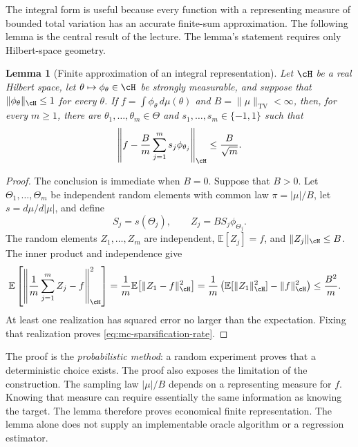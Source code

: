 \documentclass[11pt,twoside]{article}
\newcommand{\E}{\mathbb E}
\newcommand{\TV}{\operatorname{TV}}
\newtheorem{lemma}[theorem]{Lemma}
\theoremstyle{definition}
\theoremstyle{remark}
\begin{document}
The integral form is useful because every function with a representing
measure of bounded total variation has an accurate finite-sum approximation.
The following lemma is the central result of the lecture. The lemma's statement
requires only Hilbert-space geometry.

\begin{lemma}[Finite approximation of an integral representation]
\label{lem:mc-sparsification}
Let \(\cH\) be a real Hilbert space, let
\(\theta\mapsto\phi_\theta\in\cH\) be strongly measurable, and suppose that
\(\|\phi_\theta\|_{\cH}\leq1\) for every \(\theta\). If
\(f=\int\phi_\theta\,d\mu(\theta)\) and
\(B=\|\mu\|_{\TV}<\infty\), then, for every \(m\geq1\), there are
\(\theta_1,\ldots,\theta_m\in\Theta\) and
\(s_1,\ldots,s_m\in\{-1,1\}\) such that
\begin{equation}
 \left\|f-\frac{B}{m}\sum_{j=1}^m
 s_j\phi_{\theta_j}\right\|_{\cH}
 \leq\frac{B}{\sqrt m}.
 \label{eq:mc-sparsification-rate}
\end{equation}
\end{lemma}

\begin{proof}
The conclusion is immediate when \(B=0\). Suppose that \(B>0\). Let
\(\Theta_1,\ldots,\Theta_m\) be independent random elements with common law
\(\pi=|\mu|/B\), let \(s=d\mu/d|\mu|\), and define
\[
 S_j=s(\Theta_j),
 \qquad
 Z_j=B S_j\phi_{\Theta_j}.
\]
The random elements \(Z_1,\ldots,Z_m\) are independent,
\(\E[Z_j]=f\), and \(\|Z_j\|_{\cH}\leq B\). The inner product and
independence give
\begin{align}
 \E\left[
 \left\|\frac1m\sum_{j=1}^mZ_j-f\right\|_{\cH}^2\right]
 &=\frac1m\E\bigl[\|Z_1-f\|_{\cH}^2\bigr]
 =\frac1m\left(\E[\|Z_1\|_{\cH}^2]-\|f\|_{\cH}^2\right)
 \leq\frac{B^2}{m}.
 \label{eq:mc-proof}
\end{align}
At least one realization has squared error no larger than the expectation.
Fixing that realization proves \cref{eq:mc-sparsification-rate}.
\end{proof}

The proof is the \emph{probabilistic method}: a random experiment proves that
a deterministic choice exists. The proof also exposes the limitation of the
construction. The sampling law \(|\mu|/B\) depends on a representing measure
for \(f\). Knowing that measure can require essentially the same information
as knowing the target. The lemma therefore proves economical finite
representation. The lemma alone does not supply an implementable oracle
algorithm or a regression estimator.
\end{document}

